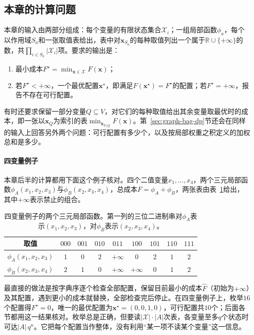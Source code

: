 \subsection{本章的计算问题}
\label{sec:graph-dp-problem}

本章的输入由两部分组成：每个变量的有限状态集合$\mathcal X_i$；一组局部函数$\phi_a$，每个以作用域$S_a$和一张取值表给出，表中对$\bm x_{S_a}$的每种取值列出一个属于$\mathbb R\cup\{+\infty\}$的数，共$\prod_{i\in S_a}|\mathcal X_i|$项。要求的输出是：
\begin{enumerate}
  \item 最小成本$F^\star=\min_{\bm x\in\mathcal X}F(\bm x)$；
  \item 若$F^\star<+\infty$，一个最优配置$\bm x^\star$，即满足$F(\bm x^\star)=F^\star$的配置；若$F^\star=+\infty$，报告不存在可行配置。
\end{enumerate}
有时还要求保留一部分变量$Q\subseteq V$，对它们的每种取值给出其余变量取最优时的成本，即一张以$\bm x_Q$为索引的表$\min_{\bm x_{V\setminus Q}}F(\bm x)$。第~\ref{sec:graph-bag-dp}节还会在同样的输入上回答另外两个问题：可行配置有多少个，以及按局部权重之积定义的加权总和是多少。

\paragraph{四变量例子}
本章后半的计算都用下面这个例子核对。四个二值变量$x_1,\ldots,x_4$，两个三元局部函数$\phi_A(x_1,x_2,x_3)$与$\phi_B(x_2,x_3,x_4)$，总成本$F=\phi_A+\phi_B$，两张表由表~\ref{tab:graph-dp-ternary-tables}给出，其中$+\infty$表示禁止的组合。

\begin{table}[!htb]
  \centering
  \caption{四变量例子的两个三元局部函数。第一列的三位二进制串对$\phi_A$表示$(x_1,x_2,x_3)$，对$\phi_B$表示$(x_2,x_3,x_4)$。}
  \label{tab:graph-dp-ternary-tables}
  \begin{tabular}{ccccccccc}
    \toprule
    取值 & $000$ & $001$ & $010$ & $011$ & $100$ & $101$ & $110$ & $111$\\
    \midrule
    $\phi_A(x_1,x_2,x_3)$ & $1$ & $0$ & $2$ & $+\infty$ & $0$ & $2$ & $1$ & $2$\\
    $\phi_B(x_2,x_3,x_4)$ & $2$ & $1$ & $0$ & $+\infty$ & $+\infty$ & $0$ & $1$ & $2$\\
    \bottomrule
  \end{tabular}
\end{table}

最直接的做法是按字典序逐个检查全部配置，保留目前最小的成本$\hat F$（初始为$+\infty$）及其配置，遇到更小的成本就替换，全部检查完后停止。在四变量例子上，枚举$16$个配置得$F^\star=0$，唯一的最优配置为$\bm x^\star=(0,0,1,0)$，可行配置共$10$个；后面各节都用这一结果核对。枚举总是正确，但要读$|\mathcal X|\cdot|A|$次表，各变量至多$q$个状态时可达$|A|\,q^n$。它把每个配置当作整体，没有利用“某一项不读某个变量”这一信息。

